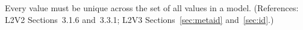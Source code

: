 Every   value must be unique across the set of all
 values in a model.  (References: L2V2 Sections~3.1.6 and~3.3.1;
L2V3 Sections~\ref{sec:metaid} and~\ref{sec:id}.)
